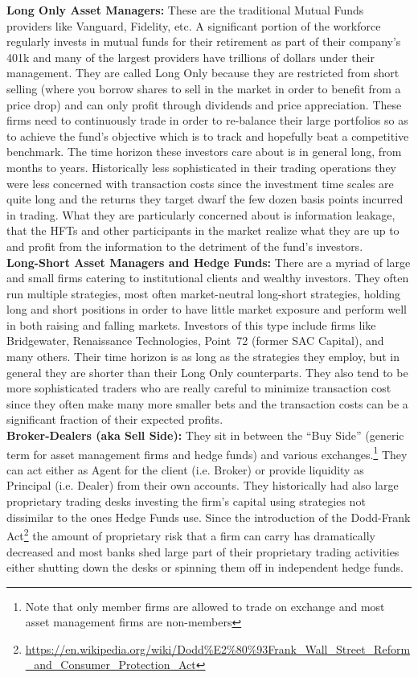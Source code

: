\noindent\textbf{Long Only Asset Managers:} These are the traditional Mutual Funds providers like Vanguard, Fidelity, etc. A significant portion of the workforce regularly invests in mutual funds for their retirement as part of their company's 401k and many of the largest providers have trillions of dollars under their management. They are called Long Only because they are restricted from short selling (where you borrow shares to sell in the market in order to benefit from a price drop) and can only profit through dividends and price appreciation. These firms need to continuously trade in order to re-balance their large portfolios so as to achieve the fund's objective which is to track and hopefully beat a competitive benchmark. The time horizon these investors care about is in general long, from months to years. Historically less sophisticated in their trading operations they were less concerned with transaction costs since the investment time scales are quite long and the returns they target dwarf the few dozen basis points incurred in trading. What they are particularly concerned about is information leakage, that the HFTs and other participants in the market realize what they are up to and profit from the information to the detriment of the fund's investors. \\


\noindent\textbf{ Long-Short Asset Managers and Hedge Funds:} There are a myriad of large and small firms catering to institutional clients and wealthy investors. They often run multiple strategies, most often market-neutral long-short strategies, holding long and short positions in order to have little market exposure and  perform well in both raising and falling markets. Investors of this type include firms like Bridgewater, Renaissance Technologies, Point~72 (former SAC Capital), and many others. Their time horizon is as long as the strategies they employ, but in general they are shorter than their Long Only counterparts. They also tend to be more sophisticated traders who are really careful to minimize transaction cost since they often make many more smaller bets and the transaction costs can be a significant fraction of their expected profits. \\


\noindent\textbf{Broker-Dealers (aka Sell Side):} They sit in between the ``Buy Side'' (generic term for asset management firms and hedge funds) and various exchanges.\footnote{Note that only member firms are allowed to trade on exchange and most asset management firms are non-members} They can act either as Agent for the client (i.e. Broker) or provide liquidity as Principal (i.e. Dealer) from their own accounts. They historically had  also large proprietary trading desks investing the firm's capital using strategies not dissimilar to the ones Hedge Funds use. Since the introduction of the Dodd-Frank Act\footnote{\url{https://en.wikipedia.org/wiki/Dodd\%E2\%80\%93Frank_Wall_Street_Reform_and_Consumer_Protection_Act}} the amount of proprietary risk that a firm can carry has dramatically decreased and most banks shed large part of their proprietary trading activities either shutting down the desks or spinning them off in independent hedge funds. \\


